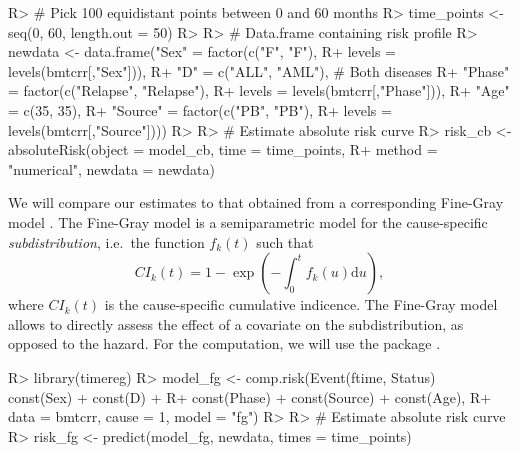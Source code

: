 \documentclass[
]{jss}
\begin{document}
\begin{CodeChunk}

\begin{CodeInput}
R> # Pick 100 equidistant points between 0 and 60 months
R> time_points <- seq(0, 60, length.out = 50)
R> 
R> # Data.frame containing risk profile
R> newdata <- data.frame("Sex" = factor(c("F", "F"), 
R+                                      levels = levels(bmtcrr[,"Sex"])),
R+                       "D" = c("ALL", "AML"), # Both diseases
R+                       "Phase" = factor(c("Relapse", "Relapse"), 
R+                                        levels = levels(bmtcrr[,"Phase"])),
R+                       "Age" = c(35, 35),
R+                       "Source" = factor(c("PB", "PB"), 
R+                                         levels = levels(bmtcrr[,"Source"])))
R> 
R> # Estimate absolute risk curve
R> risk_cb <- absoluteRisk(object = model_cb, time = time_points,
R+                         method = "numerical", newdata = newdata)
\end{CodeInput}
\end{CodeChunk}

We will compare our estimates to that obtained from a corresponding
Fine-Gray model \citep{fine1999proportional}. The Fine-Gray model is a
semiparametric model for the cause-specific \emph{subdistribution},
i.e.~the function \(f_k(t)\) such that
\[CI_k(t) =1 - \exp\left( - \int_0^t f_k(u) \textrm{d}u \right),\] where
\(CI_k(t)\) is the cause-specific cumulative indicence. The Fine-Gray
model allows to directly assess the effect of a covariate on the
subdistribution, as opposed to the hazard. For the computation, we will
use the  package \citep{timereg}.

\begin{CodeChunk}

\begin{CodeInput}
R> library(timereg)
R> model_fg <- comp.risk(Event(ftime, Status) ~ const(Sex) + const(D) + 
R+                           const(Phase) + const(Source) + const(Age), 
R+                       data = bmtcrr, cause = 1, model = "fg")
R> 
R> # Estimate absolute risk curve
R> risk_fg <- predict(model_fg, newdata, times = time_points)
\end{CodeInput}
\end{CodeChunk}
\end{document}
